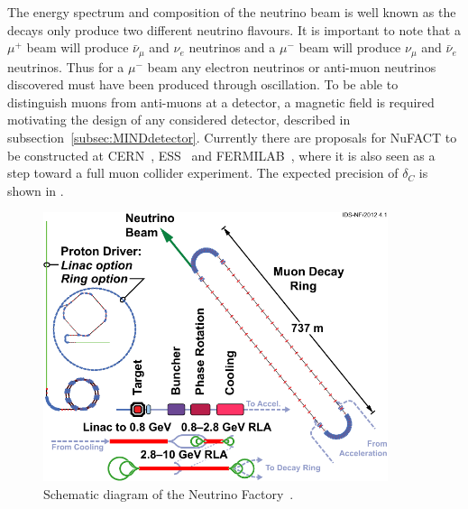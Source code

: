 The energy spectrum and composition of the neutrino beam is well known as the decays only produce two different neutrino flavours. It is important to note that a $\mu^+$ beam will produce $\bar{\nu}_\mu$ and $\nu_e$ neutrinos and a $\mu^-$ beam will produce $\nu_\mu$ and $\bar{\nu}_e$ neutrinos. Thus for a $\mu^-$ beam any electron neutrinos or anti-muon neutrinos discovered must have been produced through oscillation. To be able to distinguish muons from anti-muons at a detector, a magnetic field is required motivating the design of any considered detector, described in subsection~\ref{subsec:MINDdetector}. Currently there are proposals for NuFACT to be constructed at CERN~\cite{25NUfact}, ESS~\cite{ESS} and FERMILAB~\cite{NuFACTfermi}, where it is also seen as a step toward a full muon collider experiment. The expected precision of $\delta_{C}$ is shown in .

\begin{figure}[h!]
\centering
\includegraphics[width=0.9\textwidth]{figures/131112-IDS-NF.pdf}
\caption{Schematic diagram of the Neutrino Factory~\cite{Fix7}.}
\label{fig:nuFact}
\end{figure}

